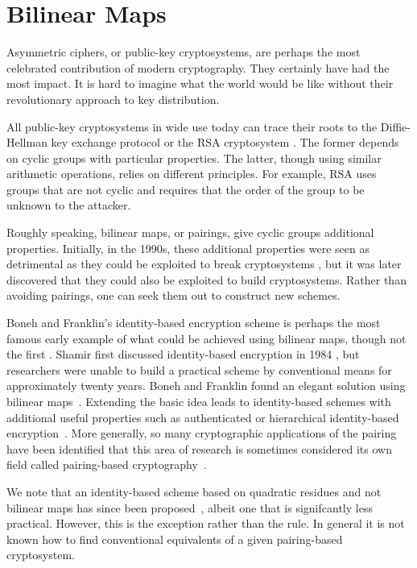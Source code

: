 \chapter{Bilinear Maps}

Asymmetric ciphers, or public-key cryptosystems, are perhaps
the most celebrated contribution of modern cryptography.
They certainly have had the most impact. It is hard to imagine
what the world would be like without their revolutionary
approach to key distribution.

All public-key cryptosystems in wide use today can trace their
roots to the Diffie-Hellman key exchange protocol \cite{diffie76new}
or the RSA cryptosystem \cite{RSA}.
The former depends on cyclic groups
with particular properties. The latter, though
using similar arithmetic operations, relies on different principles.
For example, RSA uses groups that
are not cyclic and requires that the order of the group to be unknown
to the attacker.

Roughly speaking, bilinear maps, or pairings,
give cyclic groups additional properties.
Initially, in the 1990s,
these additional properties were seen as detrimental
as they could be exploited to break cryptosystems \cite{mov, fr, fmr},
but it was later discovered
that they could also be exploited to build cryptosystems.
Rather than avoiding pairings, one can seek them out to construct new
schemes.

Boneh and Franklin's identity-based encryption scheme \cite{bf} is perhaps
the most famous early example of what could be achieved using
bilinear maps, though not the first \cite{sok, j}.
Shamir first discussed identity-based encryption in 1984 \cite{shamir1984},
but researchers were unable to build a practical scheme by
conventional means for approximately twenty years. 
Boneh and Franklin found an elegant solution using
bilinear maps~\cite{bf}. Extending the basic idea leads to
identity-based schemes with additional useful properties
such as authenticated or hierarchical
identity-based encryption~\cite{l, hl}. More generally,
so many cryptographic applications of the pairing have been identified
that this area of research is sometimes considered its own field called
pairing-based cryptography~\cite{thelounge}.

We note that an identity-based scheme based on quadratic residues
and not bilinear maps has since been proposed~\cite{cocks01, bgh},
albeit one that is signifcantly less practical.
However, this is the exception rather than the rule. In general it is not
known how to find conventional
equivalents of a given pairing-based cryptosystem.

